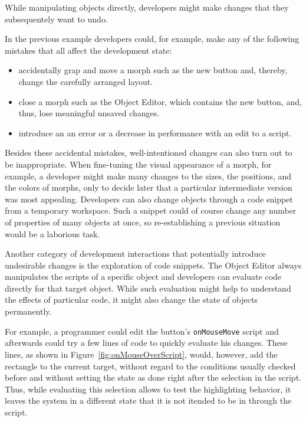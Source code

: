 While manipulating objects directly, developers might make changes that they subsequentely want to undo.

In the previous example developers could, for example, make any of the following mistakes that all affect the development state:

\begin{itemize}
    \item accidentally grap and move a morph such as the new button and, thereby, change the carefully arranged layout.
    \item close a morph such as the Object Editor, which contains the new button, and, thus, lose meaningful unsaved changes.
    \item introduce an an error or a decrease in performance with an edit to a script.
\end{itemize}

Besides these accidental mistakes, well-intentioned changes can also turn out to be inappropriate.
When fine-tuning the visual appearance of a morph, for example, a developer might make many changes to the sizes, the positions, and the colors of morphs, only to decide later that a particular intermediate version was most appealing.
Developers can also change objects through a code snippet from a temporary workspace.
Such a snippet could of course change any number of properties of many objects at once, so re-establishing a previous situation would be a laborious task.

Another category of development interactions that potentially introduce undesirable changes is the exploration of code snippets.
The Object Editor always manipulates the scripts of a specific object and developers can evaluate code directly for that target object.
While such evaluation might help to understand the effects of particular code, it might also change the state of objects permanently.

For example, a programmer could edit the button's \lstinline{onMouseMove} script and afterwards could try a few lines of code to quickly evaluate his changes.
These lines, as shown in Figure~\ref{fig:onMouseOverScript}, would, however, add the rectangle to the current target, without regard to the conditions usually checked before and without setting the state as done right after the selection in the script.
Thus, while evaluating this selection allows to test the highlighting behavior, it leaves the system in a different state that it is not itended to be in through the script.

